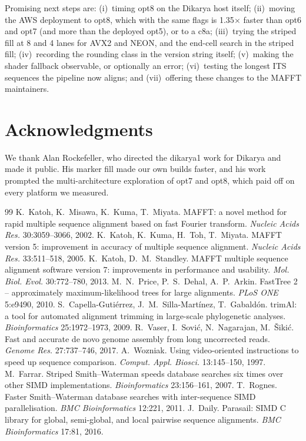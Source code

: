 \documentclass[11pt]{article}
\begin{document}
Promising next steps are:
(i)~timing opt8 on the Dikarya host itself;
(ii)~moving the AWS deployment to opt8, which with the same flags is 1.35$\times$ faster than opt6
and opt7 (and more than the deployed opt5), or to a c8a;
(iii)~trying the striped fill at 8 and 4 lanes for AVX2 and NEON, and the end-cell search in the
striped fill;
(iv)~recording the rounding class in the version string itself;
(v)~making the shader fallback observable, or optionally an error;
(vi)~testing the longest ITS sequences the pipeline now aligns;
and (vii)~offering these changes to the MAFFT maintainers.

\section*{Acknowledgments}

We thank Alan Rockefeller, who directed the dikarya1 work for Dikarya and made it public. His
marker fill made our own builds faster, and his work prompted the multi-architecture
exploration of opt7 and opt8, which paid off on every platform we measured.

\begin{thebibliography}{99}\small
{} K.~Katoh, K.~Misawa, K.~Kuma, T.~Miyata. MAFFT: a novel method for
  rapid multiple sequence alignment based on fast Fourier transform.
  \emph{Nucleic Acids Res.} 30:3059--3066, 2002.
 K.~Katoh, K.~Kuma, H.~Toh, T.~Miyata. MAFFT version 5: improvement in
  accuracy of multiple sequence alignment. \emph{Nucleic Acids Res.} 33:511--518, 2005.
 K.~Katoh, D.~M.~Standley. MAFFT multiple sequence alignment software
  version 7: improvements in performance and usability. \emph{Mol. Biol. Evol.}
  30:772--780, 2013.
 M.~N.~Price, P.~S.~Dehal, A.~P.~Arkin. FastTree 2 -- approximately
  maximum-likelihood trees for large alignments. \emph{PLoS ONE} 5:e9490, 2010.
 S.~Capella-Guti\'errez, J.~M.~Silla-Mart\'inez, T.~Gabald\'on.
  trimAl: a tool for automated alignment trimming in large-scale phylogenetic analyses.
  \emph{Bioinformatics} 25:1972--1973, 2009.
 R.~Vaser, I.~Sovi\'c, N.~Nagarajan, M.~\v{S}iki\'c. Fast and accurate
  de novo genome assembly from long uncorrected reads. \emph{Genome Res.} 27:737--746,
  2017.
 A.~Wozniak. Using video-oriented instructions to speed up sequence
  comparison. \emph{Comput. Appl. Biosci.} 13:145--150, 1997.
 M.~Farrar. Striped Smith--Waterman speeds database searches six times
  over other SIMD implementations. \emph{Bioinformatics} 23:156--161, 2007.
 T.~Rognes. Faster Smith--Waterman database searches with
  inter-sequence SIMD parallelisation. \emph{BMC Bioinformatics} 12:221, 2011.
 J.~Daily. Parasail: SIMD C library for global, semi-global, and local
  pairwise sequence alignments. \emph{BMC Bioinformatics} 17:81, 2016.
\end{thebibliography}
\end{document}
